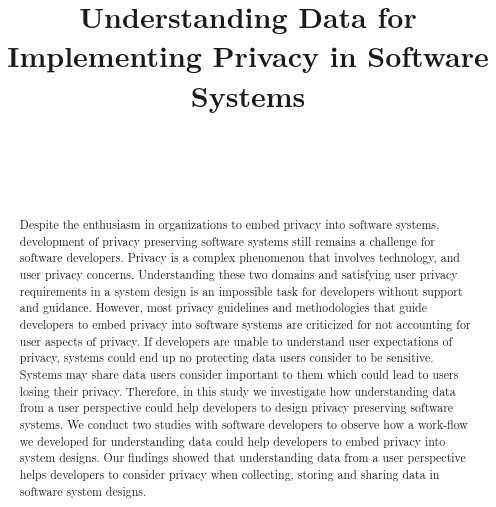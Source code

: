 \documentclass{sigchi}
\def\plaintitle{Understanding Data for Implementing Privacy in Software Systems}
\begin{document}
\title{\plaintitle}

\author{%
  \\
  \\
  \\
}

\maketitle

\begin{abstract}
Despite the enthusiasm in organizations to embed privacy into software systems, development of privacy preserving software systems still remains a challenge for software developers. Privacy is a complex phenomenon that involves technology, and user privacy concerns. Understanding these two domains and satisfying user privacy requirements in a system design is an impossible task for developers without support and guidance. However, most privacy guidelines and methodologies that guide developers to embed privacy into software systems are criticized for not accounting for user aspects of privacy. If developers are unable to understand user expectations of privacy, systems could end up no protecting data users consider to be sensitive. Systems may share data users consider important to them which could lead to users losing their privacy. Therefore, in this study we investigate how understanding data from a user perspective could help developers to design privacy preserving software systems. We conduct two studies with software developers to observe how a work-flow we developed for understanding data could help developers to embed privacy into system designs. Our findings showed that understanding data from a user perspective helps developers to consider privacy when collecting, storing and sharing data in software system designs. 
\end{abstract}
\end{document}
